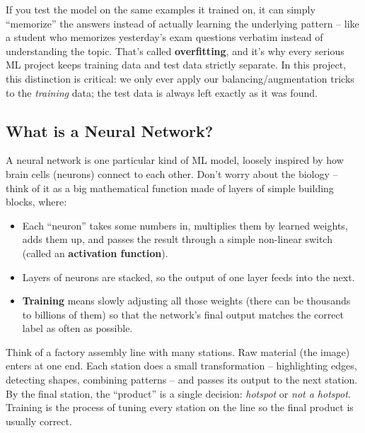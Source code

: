 \documentclass[11pt]{article}
\begin{document}
\begin{keyidea}
If you test the model on the same examples it trained on, it can
simply ``memorize'' the answers instead of actually learning the
underlying pattern -- like a student who memorizes yesterday's exam
questions verbatim instead of understanding the topic. That's called
\textbf{overfitting}, and it's why every serious ML project keeps
training data and test data strictly separate. In this project, this
distinction is critical: we only ever apply our balancing/augmentation
tricks to the \emph{training} data; the test data is always left
exactly as it was found.
\end{keyidea}

\subsection{What is a Neural Network?}
A neural network is one particular kind of ML model, loosely inspired
by how brain cells (neurons) connect to each other. Don't worry about
the biology -- think of it as a big mathematical function made of
layers of simple building blocks, where:

\begin{itemize}[leftmargin=1.2em]
    \item Each ``neuron'' takes some numbers in, multiplies them by
    learned weights, adds them up, and passes the result through a
    simple non-linear switch (called an \textbf{activation
    function}).
    \item Layers of neurons are stacked, so the output of one layer
    feeds into the next.
    \item \textbf{Training} means slowly adjusting all those weights
    (there can be thousands to billions of them) so that the
    network's final output matches the correct label as often as
    possible.
\end{itemize}

\begin{analogy}
Think of a factory assembly line with many stations. Raw material
(the image) enters at one end. Each station does a small
transformation -- highlighting edges, detecting shapes, combining
patterns -- and passes its output to the next station. By the final
station, the ``product'' is a single decision: \emph{hotspot} or
\emph{not a hotspot}. Training is the process of tuning every station
on the line so the final product is usually correct.
\end{analogy}
\end{document}
